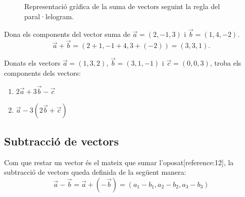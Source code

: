 \documentclass[12pt]{article}
\begin{document}
\begin{figure}[htbp]
    \centering
    \caption{Representació gràfica de la suma de vectors seguint la regla del paral·lelogram.}
    \label{fig:suma_vectors}
\end{figure}

\begin{exemple}
Dona els components del vector suma de $\vec{a} = (2, -1, 3)$ i $\vec{b} = (1, 4, -2)$.
\[
\vec{a} + \vec{b} = (2+1, -1+4, 3+(-2)) = (3, 3, 1).
\]
\end{exemple}

\begin{exercici}
Donats els vectors $\vec{a} = (1, 3, 2)$, $\vec{b} = (3, 1, -1)$ i $\vec{c} = (0, 0, 3)$, troba els components dels vectors:
\begin{enumerate}[label=\alph*)]
    \item $2\vec{a} + 3\vec{b} - \vec{c}$
    \item $\vec{a} - 3(2\vec{b} + \vec{c})$
\end{enumerate}
\end{exercici}

\subsection{Subtracció de vectors}

\begin{concept}
Com que restar un vector és el mateix que sumar l'oposat[reference:12], la subtracció de vectors queda definida de la següent manera:
\[
\vec{a} - \vec{b} = \vec{a} + (-\vec{b}) = (a_1 - b_1, a_2 - b_2, a_3 - b_3)
\]
\end{concept}
\end{document}
